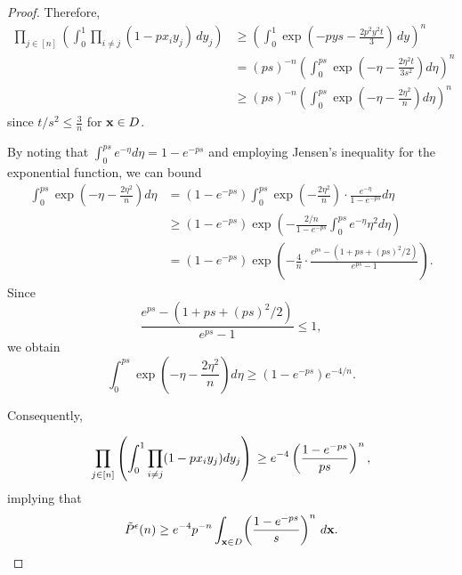 \documentclass[11pt]{amsart}
\theoremstyle{remark}
\numberwithin{equation}{section}
\begin{document}
\begin{proof}
Therefore,
\begin{align*}
\prod_{j \in [n]}\left(\int_0^1 \prod_{i \neq j} (1-px_iy_j)\,dy_j\right)
&\geq \left(\int_0^1 \exp\left(-pys-\frac{2p^2y^2t}{3}\right)\,dy\right)^n\\
&= (ps)^{-n} \left( \int_0^{ps} \exp \left( -\eta - \frac{2\eta^2 t}{3 s^2} \right) d\eta \right)^n \\
&\geq (ps)^{-n} \left( \int_0^{ps} \exp \left( -\eta - \frac{2 \eta^2}{n} \right) d\eta \right)^n
\end{align*}
since $t / s^2 \leq \frac{3}{n}$ for $\bold x \in D$.


By noting that $\int_{0}^{ps} e^{-\eta} d\eta = 1-e^{-ps}$ and employing Jensen's inequality for the exponential function, we can bound
\begin{align*}
    \int_0^{ps} \exp \left( -\eta - \frac{2 \eta^2}{n} \right) d\eta 
    &= (1-e^{-ps})\int_0^{ps} \exp \left(- \frac{2 \eta^2}{n} \right) \cdot \frac{e^{-\eta}}{1-e^{-ps}} d\eta\\
    &\geq(1 - e^{-ps}) \exp \left( -\frac{2 / n}{1 - e^{-ps}} \int_0^{ps} e^{-\eta} \eta^2 d\eta \right) \\
    &= (1 - e^{-ps}) \exp \left( -\frac{4}{n} \cdot \frac{ e^{ps} - \left(1 + ps + (ps)^2 / 2\right)}{e^{ps} - 1} \right).
\end{align*}
Since
\begin{equation*}
\frac{ e^{ps} - \left(1 + ps + (ps)^2 / 2\right)}{e^{ps} - 1} \leq 1,
\end{equation*}
we obtain
\begin{equation*}
\int_0^{ps} \exp \left( -\eta - \frac{2 \eta^2}{n} \right) d\eta \geq (1 - e^{-ps}) e^{-4 / n}.   
\end{equation*}

Consequently,

\begin{equation*}
\prod_{j \in [n]} \left( \int_0^1 \prod_{i \neq j} (1 - p x_i y_j) dy_j \right) \\
\geq e^{-4} \left(\frac{1 - e^{-ps}}{ps} \right)^n,  
\end{equation*}
implying that
\begin{equation*}
\tilde{P}^\epsilon(n) \geq e^{-4} p^{-n} \int_{\bold x\in D}\! \left(\frac{1 - e^{-ps}}{s} \right)^n\,d\bold x.
\end{equation*}


\end{proof}
\end{document}
